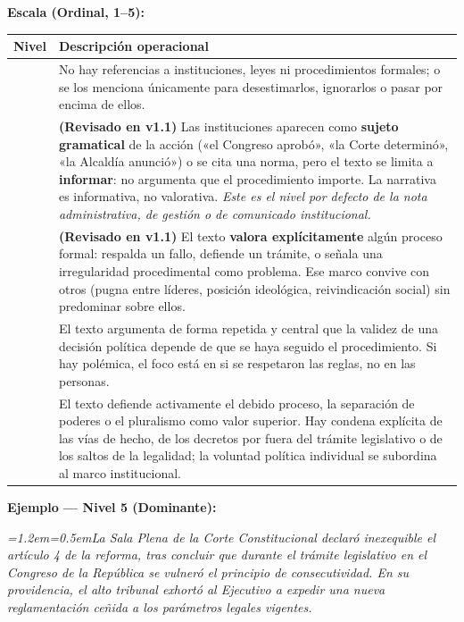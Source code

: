 \documentclass[11pt,letterpaper]{article}
\newcommand{\ejemplo}[2]{%
  \par\smallskip\noindent\textbf{Ejemplo — #1:}\par\nopagebreak
  \begingroup\itshape\small\leftskip=1.2em\rightskip=0.5em\noindent #2\par\endgroup\smallskip}
\begin{document}
\textbf{Escala (Ordinal, 1–5):}
\begin{longtable}{@{}>{\centering\arraybackslash}p{1.1cm}p{14.3cm}@{}}
\toprule \textbf{Nivel} & \textbf{Descripción operacional}\\ \midrule\endhead
1 & No hay referencias a instituciones, leyes ni procedimientos formales; o se los menciona únicamente para
desestimarlos, ignorarlos o pasar por encima de ellos.\\
\addlinespace
2 & \textbf{(Revisado en v1.1)} Las instituciones aparecen como \textbf{sujeto gramatical} de la acción («el
Congreso aprobó», «la Corte determinó», «la Alcaldía anunció») o se cita una norma, pero el texto se limita
a \textbf{informar}: no argumenta que el procedimiento importe. La narrativa es informativa, no valorativa.
\emph{Este es el nivel por defecto de la nota administrativa, de gestión o de comunicado institucional.}\\
\addlinespace
3 & \textbf{(Revisado en v1.1)} El texto \textbf{valora explícitamente} algún proceso formal: respalda un
fallo, defiende un trámite, o señala una irregularidad procedimental como problema. Ese marco convive con
otros (pugna entre líderes, posición ideológica, reivindicación social) sin predominar sobre ellos.\\
\addlinespace
4 & El texto argumenta de forma repetida y central que la validez de una decisión política depende de que se
haya seguido el procedimiento. Si hay polémica, el foco está en si se respetaron las reglas, no en las
personas.\\
\addlinespace
5 & El texto defiende activamente el debido proceso, la separación de poderes o el pluralismo como valor
superior. Hay condena explícita de las vías de hecho, de los decretos por fuera del trámite legislativo o de
los saltos de la legalidad; la voluntad política individual se subordina al marco institucional.\\
\bottomrule
\end{longtable}

\ejemplo{Nivel 5 (Dominante)}{La Sala Plena de la Corte Constitucional declaró inexequible el artículo 4 de
la reforma, tras concluir que durante el trámite legislativo en el Congreso de la República se vulneró el
principio de consecutividad. En su providencia, el alto tribunal exhortó al Ejecutivo a expedir una nueva
reglamentación ceñida a los parámetros legales vigentes.}
\end{document}

